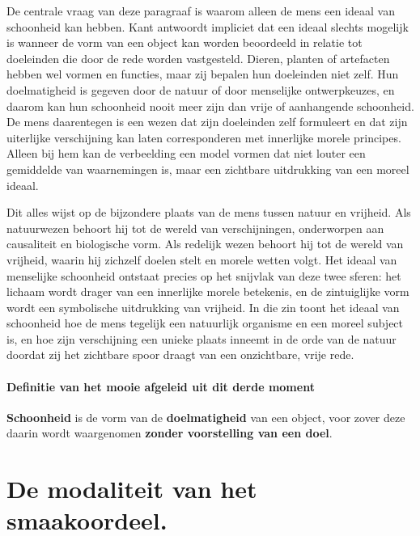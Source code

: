 \begin{mdframed}[leftmargin=0pt,rightmargin=0pt,backgroundcolor=blue!6,linecolor=white,innertopmargin=6pt,innerbottommargin=6pt]
De centrale vraag van deze paragraaf is waarom alleen de mens een ideaal van schoonheid kan hebben. Kant antwoordt impliciet dat een ideaal slechts mogelijk is wanneer de vorm van een object kan worden beoordeeld in relatie tot doeleinden die door de rede worden vastgesteld. Dieren, planten of artefacten hebben wel vormen en functies, maar zij bepalen hun doeleinden niet zelf. Hun doelmatigheid is gegeven door de natuur of door menselijke ontwerpkeuzes, en daarom kan hun schoonheid nooit meer zijn dan vrije of aanhangende schoonheid. De mens daarentegen is een wezen dat zijn doeleinden zelf formuleert en dat zijn uiterlijke verschijning kan laten corresponderen met innerlijke morele principes. Alleen bij hem kan de verbeelding een model vormen dat niet louter een gemiddelde van waarnemingen is, maar een zichtbare uitdrukking van een moreel ideaal.

Dit alles wijst op de bijzondere plaats van de mens tussen natuur en vrijheid. Als natuurwezen behoort hij tot de wereld van verschijningen, onderworpen aan causaliteit en biologische vorm. Als redelijk wezen behoort hij tot de wereld van vrijheid, waarin hij zichzelf doelen stelt en morele wetten volgt. Het ideaal van menselijke schoonheid ontstaat precies op het snijvlak van deze twee sferen: het lichaam wordt drager van een innerlijke morele betekenis, en de zintuiglijke vorm wordt een symbolische uitdrukking van vrijheid. In die zin toont het ideaal van schoonheid hoe de mens tegelijk een natuurlijk organisme en een moreel subject is, en hoe zijn verschijning een unieke plaats inneemt in de orde van de natuur doordat zij het zichtbare spoor draagt van een onzichtbare, vrije rede.
\end{mdframed}

\paragraph{Definitie van het mooie afgeleid uit dit derde moment}
\textbf{Schoonheid} is de vorm van de \textbf{doelmatigheid} van een object, voor zover deze daarin wordt waargenomen \textbf{zonder voorstelling van een doel}.


\section{De modaliteit van het smaakoordeel.} %

